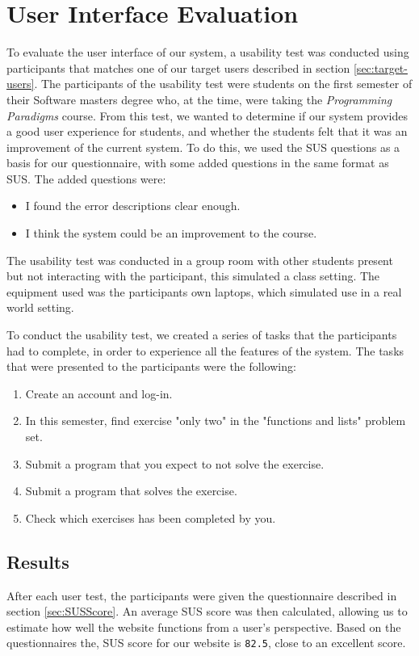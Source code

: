 \section{User Interface Evaluation} \label{UIEval}
To evaluate the user interface of our system, a usability test was conducted using participants that matches one of our target users described in section \ref{sec:target-users}.
The participants of the usability test were students on the first semester of their Software masters degree who, at the time, were taking the \textit{Programming Paradigms} course.
From this test, we wanted to determine if our system provides a good user experience for students, and whether the students felt that it was an improvement of the current system.
To do this, we used the SUS questions as a basis for our questionnaire, with some added questions in the same format as SUS. The added questions were:
\begin{itemize}
    \item I found the error descriptions clear enough.
    \item I think the system could be an improvement to the course.
\end{itemize}

The usability test was conducted in a group room with other students present but not interacting with the participant, this simulated a class setting.
The equipment used was the participants own laptops, which simulated use in a real world setting.

To conduct the usability test, we created a series of tasks that the participants had to complete, in order to experience all the features of the system.
The tasks that were presented to the participants were the following:
\begin{enumerate}
    \item Create an account and log-in.
    \item In this semester, find exercise "only two" in the "functions and lists" problem set.
    \item Submit a program that you expect to not solve the exercise.
    \item Submit a program that solves the exercise.
    \item Check which exercises has been completed by you.
\end{enumerate}


\subsection{Results} \label{UiResults}
After each user test, the participants were given the questionnaire described in section \ref{sec:SUSScore}.
An average SUS score was then calculated, allowing us to estimate how well the website functions from a user's perspective.
Based on the questionnaires the, SUS score for our website is \texttt{82.5}, close to an excellent score.

